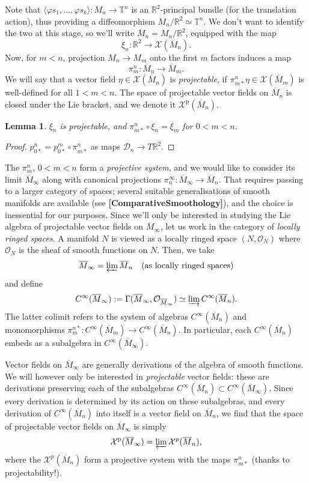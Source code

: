 \documentclass{article}
\def\sD{\mathcal{D}}
\def\RR{\mathbb{R}}
\def\TT{\mathbb{T}}
\def\XX{\mathcal{X}}
\def\OO{\mathcal{O}}
\def\p{\mathrm{p}}
\newtheorem{lem}{Lemma}
\theoremstyle{definition}
\begin{document}
Note that $\langle \varphi s_1,\dots,\varphi s_k\rangle : M_n \to \TT^n$ 
is an $\RR^2$-principal bundle (for the translation action), thus providing
a diffeomorphism
$M_n/\RR^2 \simeq \TT^n$. We don't want to identify the two at this stage,
so we'll write $\overline M_n = M_n/\RR^2$, equipped with the map
$$\xi_n:\RR^2 \to \XX(\overline M_n).$$ Now, for $m<n$, projection $M_n\to M_m$ onto 
the first $m$ factors induces a map
$$ \pi^n_m : \overline M_n \to \overline M_m. $$
We will say that a vector field $\eta \in \XX(\overline M_n)$ is \emph{projectable},
if $\pi^n_{m*}\eta \in \XX(\overline M_m)$ is well-defined for all $1 < m < n$.
The space of projectable vector fields on $\overline M_n$ is closed under the Lie bracket,
and we denote it $\XX^\p(\overline M_n)$.

\begin{lem}\label{lem:xi-proj}
        $\xi_n$ is projectable, and $\pi^n_{m*}\circ\xi_n = \xi_m$ for $0 < m < n$.
\end{lem}
\begin{proof}
        $p^n_{0*} = p^m_{0*} \circ \pi^n_{m*}$ as maps $\sD_n \to T\RR^2$.
\end{proof}


The $\pi^n_m$, $0 < m < n$ form a \emph{projective system},
and we would like to consider its limit $\overline M_\infty$ along with
canonical projections $\pi^\infty_n : \overline M_\infty \to \overline M_n$. That requires passing
to a larger category of spaces; several suitable generalisations of smooth manifolds
are available (see \textbf{[ComparativeSmoothology]}), and the choice is inessential
for our purposes. Since we'll only be interested in studying the Lie algebra of
projectable vector fields on $\overline M_\infty$, let us work in the category of 
\emph{locally ringed spaces}. 
A manifold $N$ is viewed as a locally ringed space $(N, \OO_N)$ where
$\OO_N$ is the sheaf of smooth functions on $N$. Then, we take
$$ \overline M_\infty = \varprojlim \overline M_n\quad\textrm{(as locally ringed spaces)} $$
and define
$$ C^\infty(\overline M_\infty) := \Gamma(\overline M_\infty, \OO_{\overline M_\infty}) 
\simeq \varinjlim C^\infty(\overline M_n). $$
The latter colimit refers to the system of algebras $C^\infty(\overline M_n)$ and monomorphisms 
$\pi^{n*}_m : C^\infty(\overline M_m)\to C^\infty(\overline M_n)$. In particular, each $C^\infty(\overline M_n)$ 
embeds
as a subalgebra in $C^\infty(\overline M_\infty)$.

Vector fields on $\overline M_\infty$ are generally derivations of the algebra of smooth functions.
We will however only be interested in \emph{projectable} vector fields: these are
derivations preserving each of the subalgebras $C^\infty(\overline M_n) \subset C^\infty(\overline M_\infty)$.
Since every derivation is determined by its action on these subalgebras, and every derivation of
$C^\infty(\overline M_n)$ into itself is a vector field on $\overline M_n$, we find that the space of projectable
vector fields on $\overline M_\infty$ is simply
$$
\XX^\p(\overline M_\infty) = \varprojlim \XX^p(\overline M_n),
$$
where the $\XX^p(\overline M_n)$ form a projective system with the maps $\pi^n_{m*}$ (thanks to projectability!).
\end{document}
